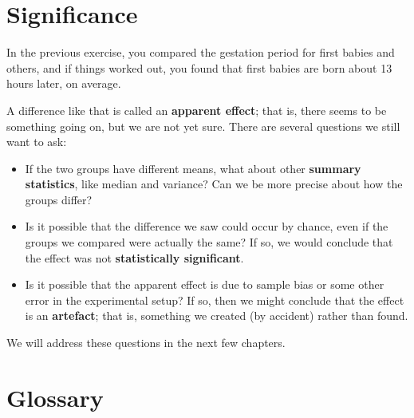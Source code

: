 \documentclass[10pt]{book}
\begin{document}
\section{Significance}

In the previous exercise, you compared the gestation
period for first babies and others, and if things worked out,
you found that first babies are born about 13 hours later,
on average.

A difference like that is called an {\bf apparent effect};
that is, there seems to be something going on, but we are not
yet sure.  There are several questions we still want to ask:

\begin{itemize}

\item If the two groups have different means, what about other {\bf
  summary statistics}, like median and variance?  Can we be more
  precise about how the groups differ?

\item Is it possible that the difference we saw could occur by chance,
  even if the groups we compared were actually the same?  If so,
  we would conclude that the effect was not {\bf statistically
    significant}.

\item Is it possible that the apparent effect is due to sample bias or
  some other error in the experimental setup?  If so, then we might
  conclude that the effect is an {\bf artefact}; that is, something we
  created (by accident) rather than found. 

\end{itemize}

We will address these questions in the next few chapters.

\section{Glossary}
\end{document}
